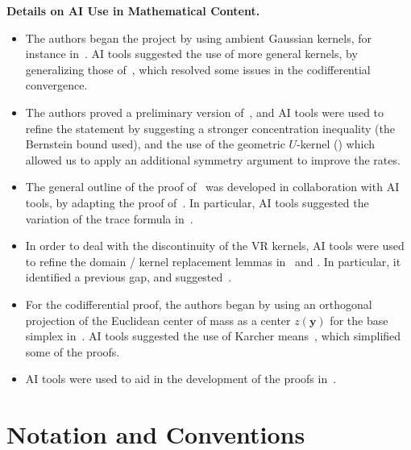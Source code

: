 \documentclass[11pt,reqno]{amsproc}
\numberwithin{equation}{section}
\newcommand{\by}{\mathbf{y}}
\theoremstyle{definition}
\theoremstyle{plain}
\begin{document}
\textbf{Details on AI Use in Mathematical Content.}
\begin{itemize}
    \item The authors began the project by using ambient Gaussian kernels, for instance in~\cite{belkin_towards_2008}. AI tools suggested the use of more general kernels, by generalizing those of~\cite{garcia_trillos_error_2020,calder_improved_2022}, which resolved some issues in the codifferential convergence.
    \item The authors proved a preliminary version of~, and AI tools were used to refine the statement by suggesting a stronger concentration inequality (the Bernstein bound used), and the use of the geometric $U$-kernel () which allowed us to apply an additional symmetry argument to improve the rates.
    \item The general outline of the proof of~ was developed in collaboration with AI tools, by adapting the proof of~. In particular, AI tools suggested the variation of the trace formula in~.
    \item In order to deal with the discontinuity of the VR kernels, AI tools were used to refine the domain / kernel replacement lemmas in~ and . In particular, it identified a previous gap, and suggested~.
    \item For the codifferential proof, the authors began by using an orthogonal projection of the Euclidean center of mass as a center $z(\by)$ for the base simplex in~. AI tools suggested the use of Karcher means~\cite{karcher_riemannian_1977}, which simplified some of the proofs.
    \item AI tools were used to aid in the development of the proofs in~.
\end{itemize}


\section{Notation and Conventions} \label{apxsec:notation}
\end{document}
